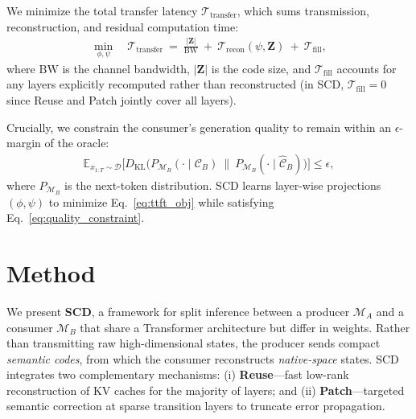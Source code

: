 \documentclass{article}
\theoremstyle{plain}
\theoremstyle{definition}
\theoremstyle{remark}
\begin{document}
We minimize the total transfer latency $\mathcal{T}_{\mathrm{transfer}}$, which sums transmission, reconstruction, and residual computation time:
\begin{align}
\min_{\phi,\psi} \quad
\mathcal{T}_{\mathrm{transfer}}
~=~
\frac{|\mathbf{Z}|}{\mathrm{BW}}
~+~
\mathcal{T}_{\mathrm{recon}}(\psi, \mathbf{Z})
~+~
\mathcal{T}_{\mathrm{fill}},
\label{eq:ttft_obj}
\end{align}
where $\mathrm{BW}$ is the channel bandwidth, $|\mathbf{Z}|$ is the code size, and $\mathcal{T}_{\mathrm{fill}}$ accounts for any layers explicitly recomputed rather than reconstructed (in SCD, $\mathcal{T}_{\mathrm{fill}}=0$ since Reuse and Patch jointly cover all layers).

Crucially, we constrain the consumer's generation quality to remain within an $\epsilon$-margin of the oracle:
\begin{align}
\mathbb{E}_{x_{1:T} \sim \mathcal{D}}
\Big[
D_{\mathrm{KL}}\Big(
P_{\mathcal{M}_B}(\cdot \mid \mathcal{C}_B)
~\Big\|~
P_{\mathcal{M}_B}(\cdot \mid \hat{\mathcal{C}}_B)
\Big)
\Big]
\le \epsilon,
\label{eq:quality_constraint}
\end{align}
where $P_{\mathcal{M}_B}$ is the next-token distribution.
SCD learns layer-wise projections $(\phi, \psi)$ to minimize Eq.~\eqref{eq:ttft_obj} while satisfying Eq.~\eqref{eq:quality_constraint}.






\section{Method}
\label{sec:method}

We present \textbf{SCD}, a framework for split inference between a producer $\mathcal{M}_A$ and a consumer $\mathcal{M}_B$ that share a Transformer architecture but differ in weights.
Rather than transmitting raw high-dimensional states, the producer sends compact \emph{semantic codes}, from which the consumer reconstructs \emph{native-space} states.
SCD integrates two complementary mechanisms:
(i) \textbf{Reuse}---fast low-rank reconstruction of KV caches for the majority of layers; and
(ii) \textbf{Patch}---targeted semantic correction at sparse transition layers to truncate error propagation.
\end{document}
